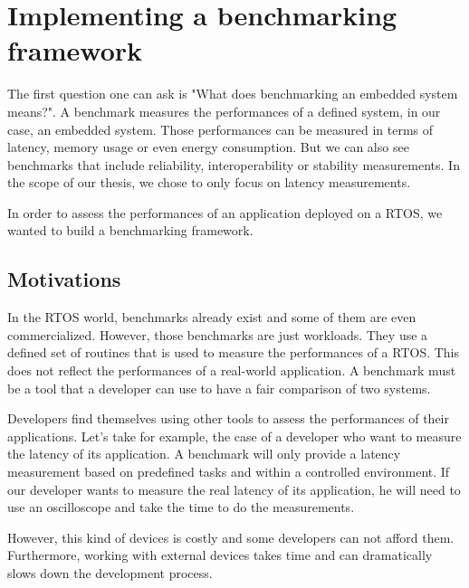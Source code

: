 \section{Implementing a benchmarking framework}


The first question one can ask is "What does benchmarking an embedded system means?".
A benchmark measures the performances of a defined system, in our case, an embedded system.
Those performances can be measured in terms of latency, memory usage or even energy consumption.
But we can also see benchmarks that include reliability, interoperability or stability measurements.
In the scope of our thesis, we chose to only focus on latency measurements.

In order to assess the performances of an application deployed on a RTOS, we wanted to build a benchmarking framework.

\subsection{Motivations}

In the RTOS world, benchmarks already exist and some of them are even commercialized.
However, those benchmarks are just workloads.
They use a defined set of routines that is used to measure the performances of a RTOS.
This does not reflect the performances of a real-world application.
A benchmark must be a tool that a developer can use to have a fair comparison of two systems.

Developers find themselves using other tools to assess the performances of their applications.
Let's take for example, the case of a developer who want to measure the latency of its application.
A benchmark will only provide a latency measurement based on predefined tasks and within a controlled environment.
If our developer wants to measure the real latency of its application, he will need to use an oscilloscope and take the time to do the measurements.

However, this kind of devices is costly and some developers can not afford them.
Furthermore, working with external devices takes time and can dramatically slows down the development process.

